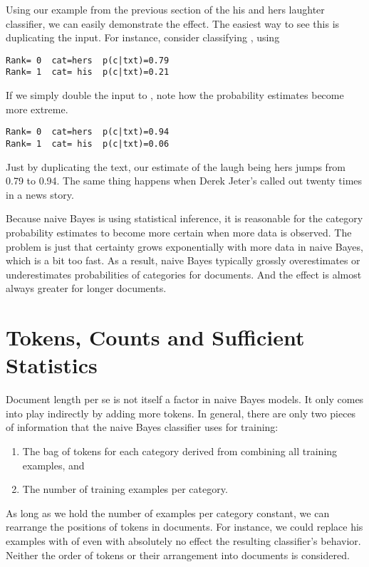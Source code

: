 Using our example from the previous section of the his and hers
laughter classifier, we can easily demonstrate the effect.  The
easiest way to see this is duplicating the input.  For instance,
consider classifying , using
%
\begin{verbatim}
Rank= 0  cat=hers  p(c|txt)=0.79
Rank= 1  cat= his  p(c|txt)=0.21
\end{verbatim}
%
If we simply double the input to ,
note how the probability estimates become more extreme.
%
\begin{verbatim}
Rank= 0  cat=hers  p(c|txt)=0.94
Rank= 1  cat= his  p(c|txt)=0.06
\end{verbatim}
%
Just by duplicating the text, our estimate of the laugh being hers
jumps from 0.79 to 0.94.  The same thing happens when Derek Jeter's
called out twenty times in a news story.

Because naive Bayes is using statistical inference, it is reasonable
for the category probability estimates to become more certain when
more data is observed.  The problem is just that certainty grows
exponentially with more data in naive Bayes, which is a bit too fast.
As a result, naive Bayes typically grossly overestimates or
underestimates probabilities of categories for documents.  And
the effect is almost always greater for longer documents.

\section{Tokens, Counts and Sufficient Statistics}

Document length per se is not itself a factor in naive Bayes models.
It only comes into play indirectly by adding more tokens.  In general,
there are only two pieces of information that the naive Bayes
classifier uses for training:
%
\begin{enumerate}
\item The bag of tokens for each category derived from combining all
  training examples, and
\item The number of training examples per category.
\end{enumerate}
%
As long as we hold the number of examples per category constant, we
can rearrange the positions of tokens in documents.  For instance,
we could replace his examples
%
%
with
%
%
of even
%
%
with absolutely no effect the resulting classifier's behavior.  Neither
the order of tokens or their arrangement into documents is considered.


